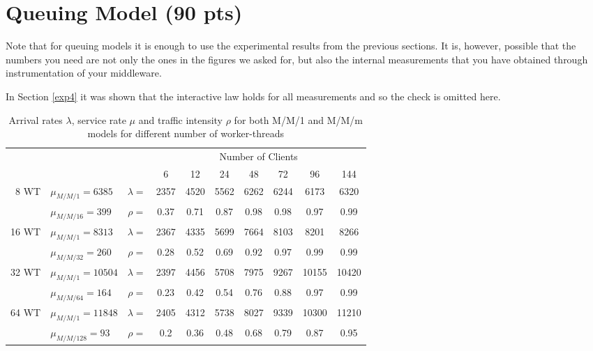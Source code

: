 \documentclass[report.tex]{subfiles}
\begin{document}
\section{Queuing Model (90 pts)}

Note that for queuing models it is enough to use the experimental results from the previous sections. It is, however, possible that the numbers you need are not only the ones in the figures we asked for, but also the internal measurements that you have obtained through instrumentation of your middleware.

In Section \ref{exp4} it was shown that the interactive law holds for all measurements and so the check is omitted here.


\begin{table}
	\centering
	\begin{tabular}{r|lcccccccc|}
		\multicolumn{3}{c}{}  & \multicolumn{7}{c}{Number of Clients}\Tstrut \\ 
		\multicolumn{3}{c}{}   & 6 & 12 & 24 & 48 & 72 & 96 & \multicolumn{1}{c}{144} \\ 
		\cline{2-10}
		\multirow{2}{*}{8 WT } & $\mu_{M/M/1} = 6385$ & $\lambda = $ & 2357 & 4520 & 5562 & 6262 & 6244 & 6173 & 6320\Tstrut \\
		& $\mu_{M/M/16} = 399$ & $\rho =$ & 0.37 & 0.71 & 0.87 & 0.98 & 0.98 & 0.97 & 0.99 \\
		\cline{2-10}
		\multirow{2}{*}{16 WT } & $\mu_{M/M/1} = 8313$ & $\lambda = $ & 2367 & 4335 & 5699 & 7664 & 8103 & 8201 & 8266\Tstrut \\
		& $\mu_{M/M/32} = 260$ & $\rho =$ & 0.28 & 0.52 & 0.69 & 0.92 & 0.97 & 0.99 & 0.99 \\
		\cline{2-10}
		\multirow{2}{*}{32 WT } & $\mu_{M/M/1} = 10504$ & $\lambda = $ & 2397 & 4456 & 5708 & 7975 & 9267 & 10155 & 10420\Tstrut \\
		& $\mu_{M/M/64} = 164$ & $\rho =$ & 0.23 & 0.42 & 0.54 & 0.76 & 0.88 & 0.97 & 0.99 \\
		\cline{2-10}
		\multirow{2}{*}{64 WT } & $\mu_{M/M/1} = 11848$ & $\lambda = $ & 2405 & 4312 & 5738 & 8027 & 9339 & 10300 & 11210\Tstrut \\
		& $\mu_{M/M/128} = 93$ & $\rho =$ & 0.2 & 0.36 & 0.48 & 0.68 & 0.79 & 0.87 & 0.95 \\
		\cline{2-10}
	\end{tabular}
	\caption{Arrival rates $\lambda$, service rate $\mu$ and traffic intensity $\rho$ for both M/M/1 and M/M/m models for different number of worker-threads} \label{exp70_arrival_service_traffic} 
\end{table}
\end{document}
